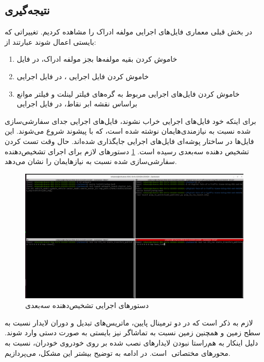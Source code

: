 \subsection{نتیجه‌گیری}

در بخش قبلی معماری فایل‌های اجرایی مولفه ادراک  را مشاهده کردیم. تغییراتی که بایستی اعمال شوند عبارتند از:
\begin{enumerate}
    \item خاموش کردن بقیه مولفه‌ها بجز مولفه ادراک، در فایل 
    \item خاموش کردن فایل اجرایی ، در فایل اجرایی 
    \item خاموش کردن فایل‌های اجرایی مربوط به گره‌های فیلتر لینلت و فیلتر موانع براساس نقشه ابر نقاط، در فایل اجرایی 
\end{enumerate}
برای اینکه خود فایل‌های اجرایی  خراب نشوند، فایل‌های اجرایی جدای سفارشی‌سازی شده نسبت به نیازمندی‌هایمان نوشته شده است، که با پیشوند  شروع می‌شوند. این فایل‌ها در ساختار پوشه‌ای فایل‌های اجرایی  جایگذاری شده‌اند.
حال وقت تست کردن تشخیص دهنده سه‌بعدی رسیده است. \cref{fig:3D_Detection_Run_Commands} دستور‌های لازم برای اجرای تشخیص‌دهنده سفارشی‌سازی شده نسبت به نیازهایمان را نشان می‌دهد. 
\begin{figure}[h!]
    \centering
    \includegraphics[width=1\linewidth]{figures/3D_Detection_Run_Commands.png}
    \caption{دستور‌های اجرایی تشخیص‌دهنده سه‌بعدی}
    \label{fig:3D_Detection_Run_Commands}
\end{figure}
لازم به ذکر است که در دو ترمینال پایین، ماتریس‌های تبدیل و دوران لایدار نسبت به سطح زمین و همچنین زمین نسبت به تماشاگر نیز بایستی به صورت دستی وارد شوند. دلیل اینکار به هم‌راستا نبودن لایدار‌های نصب شده بر روی خودروی خودران، نسبت به محور‌های مختصاتی ‌ است. در ادامه به توضیح بیشتر این مشکل، می‌پردازیم.
